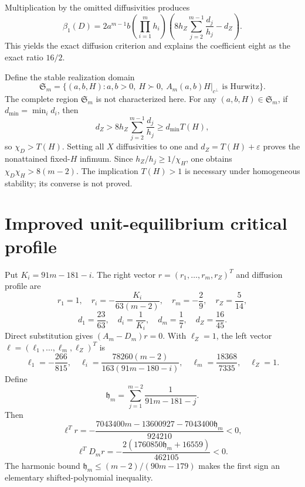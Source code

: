 \documentclass[10pt]{article}
\newcommand{\1}{\mathbf1}
\begin{document}
Multiplication by the omitted diffusivities produces
\[
 \beta_1(D)=2a^{m-1}b\left(\prod_{i=1}^mh_i\right)
 \left(8h_Z\sum_{j=2}^{m-1}\frac{d_j}{h_j}-d_Z\right).
\]
This yields the exact diffusion criterion and explains the coefficient eight
as the exact ratio $16/2$.

Define the stable realization domain
\[
 \mathfrak S_m=\{(a,b,H):a,b>0,\ H\succ0,\
 A_m(a,b)H|_{c^\perp}\text{ is Hurwitz}\}.
\]
The complete region $\mathfrak S_m$ is not characterized here.  For any
$(a,b,H)\in\mathfrak S_m$, if $d_{\min}=\min_i d_i$, then
\[
 d_Z>8h_Z\sum_{j=2}^{m-1}\frac{d_j}{h_j}
 \ge d_{\min}T(H),
\]
so $\chi_D>T(H)$.  Setting all $X$ diffusivities to one and
$d_Z=T(H)+\varepsilon$ proves the nonattained fixed-$H$ infimum.  Since
$h_Z/h_j\ge1/\chi_H$, one obtains $\chi_D\chi_H>8(m-2)$.  The implication
$T(H)>1$ is necessary under homogeneous stability; its converse is not proved.

\section{Improved unit-equilibrium critical profile}

Put $K_i=91m-181-i$.  The right vector
$r=(r_1,\ldots,r_m,r_Z)^T$ and diffusion profile are
\[
 r_1=1,\quad r_i=-\frac{K_i}{63(m-2)},\quad
 r_m=-\frac29,\quad r_Z=\frac5{14},
\]
\[
 d_1=\frac{23}{63},\quad d_i=\frac1{K_i},\quad
 d_m=\frac17,\quad d_Z=\frac{16}{45}.
\]
Direct substitution gives $(A_m-D_m)r=0$.  With $\ell_Z=1$, the left vector
$\ell=(\ell_1,\ldots,\ell_m,\ell_Z)^T$ is
\[
 \ell_1=-\frac{266}{815},\quad
 \ell_i=\frac{78260(m-2)}{163(91m-180-i)},\quad
 \ell_m=\frac{18368}{7335},\quad \ell_Z=1.
\]
Define
\[
 \mathfrak h_m=\sum_{j=1}^{m-2}\frac1{91m-181-j}.
\]
Then
\[
 \ell^Tr=-\frac{7043400m-13600927-7043400\mathfrak h_m}{924210}<0,
\]
\[
 \ell^TD_mr=-\frac{2(1760850\mathfrak h_m+16559)}{462105}<0.
\]
The harmonic bound $\mathfrak h_m\le(m-2)/(90m-179)$ makes the first sign an elementary
shifted-polynomial inequality.
\end{document}
